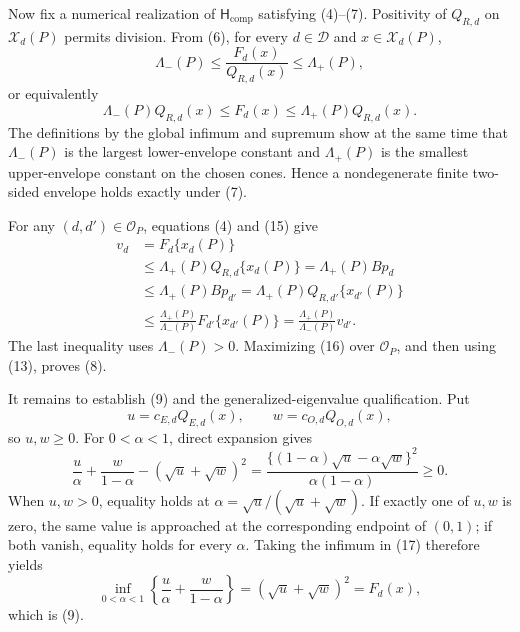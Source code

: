 Now fix a numerical realization of \(\mathsf H_{\mathrm{comp}}\) satisfying (4)--(7).  Positivity of \(Q_{R,d}\) on \(\mathcal X_d(P)\) permits division.  From (6), for every \(d\in\mathcal D\) and \(x\in\mathcal X_d(P)\),
\[
 \Lambda_-(P)
 \le\frac{F_d(x)}{Q_{R,d}(x)}
 \le\Lambda_+(P),                                         \tag{14}
\]
or equivalently
\[
 \Lambda_-(P)Q_{R,d}(x)
 \le F_d(x)
 \le\Lambda_+(P)Q_{R,d}(x).                               \tag{15}
\]
The definitions by the global infimum and supremum show at the same time that \(\Lambda_-(P)\) is the largest lower-envelope constant and \(\Lambda_+(P)\) is the smallest upper-envelope constant on the chosen cones.  Hence a nondegenerate finite two-sided envelope holds exactly under (7).

For any \((d,d')\in\mathcal O_P\), equations (4) and (15) give
\[
\begin{aligned}
 v_d
 &=F_d\{x_d(P)\}\\
 &\le\Lambda_+(P)Q_{R,d}\{x_d(P)\}
 =\Lambda_+(P)Bp_d\\
 &\le\Lambda_+(P)Bp_{d'}
 =\Lambda_+(P)Q_{R,d'}\{x_{d'}(P)\}\\
 &\le\frac{\Lambda_+(P)}{\Lambda_-(P)}
 F_{d'}\{x_{d'}(P)\}
 =\frac{\Lambda_+(P)}{\Lambda_-(P)}v_{d'}.
\end{aligned}                                              \tag{16}
\]
The last inequality uses \(\Lambda_-(P)>0\).  Maximizing (16) over \(\mathcal O_P\), and then using (13), proves (8).

It remains to establish (9) and the generalized-eigenvalue qualification.  Put
\[
 u=c_{E,d}Q_{E,d}(x),\qquad w=c_{O,d}Q_{O,d}(x),
\]
so \(u,w\ge0\).  For \(0<\alpha<1\), direct expansion gives
\[
 \frac{u}{\alpha}+\frac{w}{1-\alpha}
 -(\sqrt u+\sqrt w)^2
 =\frac{\{(1-\alpha)\sqrt u-\alpha\sqrt w\}^2}
        {\alpha(1-\alpha)}
 \ge0.                                                     \tag{17}
\]
When \(u,w>0\), equality holds at \(\alpha=\sqrt u/(\sqrt u+\sqrt w)\).  If exactly one of \(u,w\) is zero, the same value is approached at the corresponding endpoint of \((0,1)\); if both vanish, equality holds for every \(\alpha\).  Taking the infimum in (17) therefore yields
\[
 \inf_{0<\alpha<1}
 \left\{\frac{u}{\alpha}+\frac{w}{1-\alpha}\right\}
 = (\sqrt u+\sqrt w)^2=F_d(x),
\]
which is (9).

